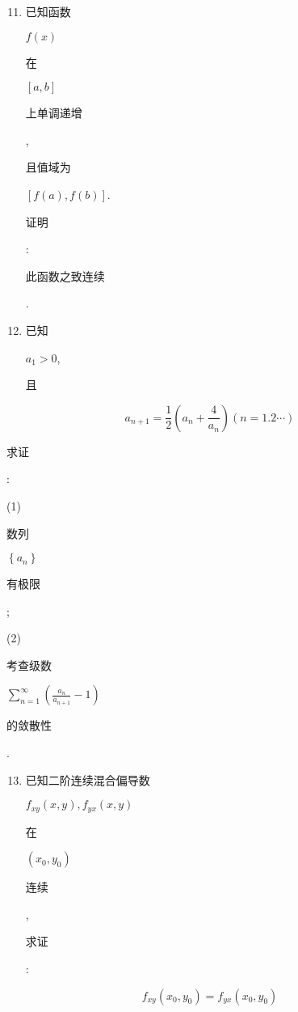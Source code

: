 \documentclass[10pt]{article}
\begin{document}
\begin{enumerate}
  \setcounter{enumi}{10}
  \item \begin{CJK}{UTF8}{mj}已知函数\end{CJK} $f(x)$ \begin{CJK}{UTF8}{mj}在\end{CJK} $[a, b]$ \begin{CJK}{UTF8}{mj}上单调递增\end{CJK}, \begin{CJK}{UTF8}{mj}且值域为\end{CJK} $[f(a), f(b)]$. \begin{CJK}{UTF8}{mj}证明\end{CJK}: \begin{CJK}{UTF8}{mj}此函数之致连续\end{CJK}.

  \item \begin{CJK}{UTF8}{mj}已知\end{CJK} $a_{1}>0$, \begin{CJK}{UTF8}{mj}且\end{CJK}

\end{enumerate}
$$
a_{n+1}=\frac{1}{2}\left(a_{n}+\frac{4}{a_{n}}\right)(n=1.2 \cdots)
$$
\begin{CJK}{UTF8}{mj}求证\end{CJK}:

(1) \begin{CJK}{UTF8}{mj}数列\end{CJK} $\left\{a_{n}\right\}$ \begin{CJK}{UTF8}{mj}有极限\end{CJK};

(2) \begin{CJK}{UTF8}{mj}考查级数\end{CJK} $\sum_{n=1}^{\infty}\left(\frac{a_{n}}{a_{n+1}}-1\right)$ \begin{CJK}{UTF8}{mj}的敛散性\end{CJK}.

\begin{enumerate}
  \setcounter{enumi}{12}
  \item \begin{CJK}{UTF8}{mj}已知二阶连续混合偏导数\end{CJK} $f_{x y}(x, y), f_{y x}(x, y)$ \begin{CJK}{UTF8}{mj}在\end{CJK} $\left(x_{0}, y_{0}\right)$ \begin{CJK}{UTF8}{mj}连续\end{CJK}, \begin{CJK}{UTF8}{mj}求证\end{CJK}:
\end{enumerate}
$$
f_{x y}\left(x_{0}, y_{0}\right)=f_{y x}\left(x_{0}, y_{0}\right)
$$
\end{document}
